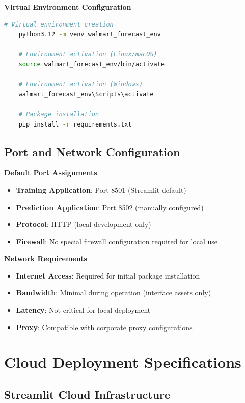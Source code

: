 \textbf{Virtual Environment Configuration}

\begin{lstlisting}[language=bash]
	# Virtual environment creation
	python3.12 -m venv walmart_forecast_env
	
	# Environment activation (Linux/macOS)
	source walmart_forecast_env/bin/activate
	
	# Environment activation (Windows)
	walmart_forecast_env\Scripts\activate
	
	# Package installation
	pip install -r requirements.txt
\end{lstlisting}

\subsection{Port and Network Configuration}

\textbf{Default Port Assignments}
\begin{itemize}
	\item \textbf{Training Application}: Port 8501 (Streamlit default)
	\item \textbf{Prediction Application}: Port 8502 (manually configured)
	\item \textbf{Protocol}: HTTP (local development only)
	\item \textbf{Firewall}: No special firewall configuration required for local use
\end{itemize}

\textbf{Network Requirements}
\begin{itemize}
	\item \textbf{Internet Access}: Required for initial package installation
	\item \textbf{Bandwidth}: Minimal during operation (interface assets only)
	\item \textbf{Latency}: Not critical for local deployment
	\item \textbf{Proxy}: Compatible with corporate proxy configurations
\end{itemize}

\section{Cloud Deployment Specifications}

\subsection{Streamlit Cloud Infrastructure}

